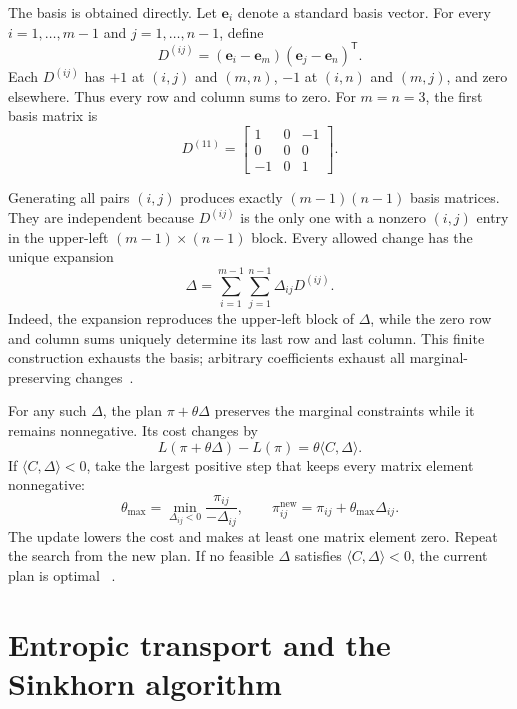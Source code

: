 \documentclass[11pt]{article}
\begin{document}
The basis is obtained directly. Let $\bm e_i$ denote a standard basis vector.
For every $i=1,\ldots,m-1$ and $j=1,\ldots,n-1$, define
\[
  D^{(ij)}
  =(\bm e_i-\bm e_m)(\bm e_j-\bm e_n)^{\mathsf T}.
\]
Each $D^{(ij)}$ has $+1$ at $(i,j)$ and $(m,n)$, $-1$ at $(i,n)$ and
$(m,j)$, and zero elsewhere. Thus every row and column sums to zero. For
$m=n=3$, the first basis matrix is
\begin{equation}
  D^{(11)}=
  \begin{bmatrix}
     1&0&-1\\
     0&0& 0\\
    -1&0& 1
  \end{bmatrix}.
  \label{eq:transport-four-entry-change}
\end{equation}

Generating all pairs $(i,j)$ produces exactly $(m-1)(n-1)$ basis matrices.
They are independent because $D^{(ij)}$ is the only one with a nonzero
$(i,j)$ entry in the upper-left $(m-1)\times(n-1)$ block. Every allowed
change has the unique expansion
\[
  \Delta
  =\sum_{i=1}^{m-1}\sum_{j=1}^{n-1}
   \Delta_{ij}D^{(ij)}.
\]
Indeed, the expansion reproduces the upper-left block of $\Delta$, while the
zero row and column sums uniquely determine its last row and last column.
This finite construction exhausts the basis; arbitrary coefficients exhaust
all marginal-preserving changes~\cite{warrington-2016}.

For any such $\Delta$, the plan $\pi+\theta\Delta$ preserves the marginal
constraints while it remains nonnegative. Its cost changes by
\begin{equation}
  L(\pi+\theta\Delta)-L(\pi)
  =\theta\langle C,\Delta\rangle.
  \label{eq:transport-four-entry-cost}
\end{equation}
If $\langle C,\Delta\rangle<0$, take the largest positive step that keeps
every matrix element nonnegative:
\begin{equation}
  \theta_{\max}
  =\min_{\Delta_{ij}<0}\frac{\pi_{ij}}{-\Delta_{ij}},
  \qquad
  \pi^{\mathrm{new}}_{ij}
  =\pi_{ij}+\theta_{\max}\Delta_{ij}.
  \label{eq:transport-update}
\end{equation}
The update lowers the cost and makes at least one matrix element zero. Repeat
the search from the new plan. If no feasible $\Delta$ satisfies
$\langle C,\Delta\rangle<0$, the current plan is optimal
~\cite{peyre-cuturi-2019}.

\section{Entropic transport and the Sinkhorn algorithm}
\end{document}
